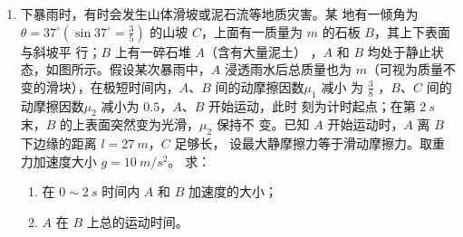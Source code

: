\begin{enumerate}
{}


\newpage
\item 
{}
下暴雨时，有时会发生山体滑坡或泥石流等地质灾害。某
地有一倾角为$ \theta =37 ^{ \circ } ( \sin 37 ^{ \circ } = \frac{ 3 }{ 5 } ) $
的山坡 $ C $，上面有一质量为 $ m $ 的石板 $ B $，其上下表面与斜坡平
行；$ B $ 上有一碎石堆 $ A $（含有大量泥土）
，$ A $ 和 $ B $ 均处于静止状态，如图所示。假设某次暴雨中，$ A $
浸透雨水后总质量也为 $ m $（可视为质量不变的滑块），在极短时间内，$ A $、$ B $ 间的动摩擦因数$ \mu _{1} $ 减小
为
$ \frac{ 3 }{ 8 } $
，$ B $、$ C $ 间的动摩擦因数$ \mu _{2} $ 减小为 $ 0.5 $，$ A $、$ B $ 开始运动，此时
刻为计时起点；在第 $ 2 \ s $ 末，$ B $ 的上表面突然变为光滑，$ \mu _{2} $ 保持不
变。已知 $ A $ 开始运动时，$ A $ 离 $ B $ 下边缘的距离 $ l=27 \ m $，$ C $ 足够长，
设最大静摩擦力等于滑动摩擦力。取重力加速度大小 $ g=10 \ m/s^{2} $。
求：
\begin{enumerate}
\renewcommand{\labelenumi}{\arabic{enumi}.}
\item
在 $ 0 \sim 2 \ s $ 时间内 $ A $ 和 $ B $ 加速度的大小；

\item 
$ A $ 在 $ B $ 上总的运动时间。



\end{enumerate}
\begin{figure}[h!]
\flushright

\end{figure}





\end{enumerate}
